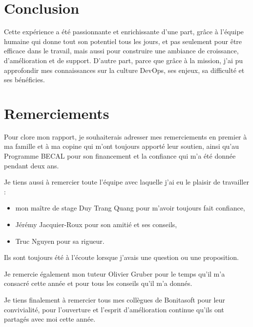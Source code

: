 \section{Conclusion}
Cette expérience a été passionnante et enrichissante d'une part, grâce à l'équipe humaine qui donne tout son potentiel tous les jours, et pas seulement pour être efficace dans le travail, mais aussi pour construire une ambiance de croissance, d'amélioration et de support.
D'autre part, parce que grâce à la mission, j'ai pu approfondir mes connaissances sur la culture DevOps, ses enjeux, sa difficulté et ses bénéficies.

\section{Remerciements}
Pour clore mon rapport, je souhaiterais adresser mes remerciements en premier à ma famille et à ma copine qui m'ont toujours apporté leur soutien, ainsi qu’au Programme BECAL pour son financement et la confiance qui m'a été donnée pendant deux ans.

Je tiens aussi à remercier toute l'équipe avec laquelle j'ai eu le plaisir de travailler :
\begin{itemize}
  \item[] mon maître de stage Duy Trang Quang pour m’avoir toujours fait confiance,
  \item[] Jérémy Jacquier-Roux pour son amitié et ses conseils,
  \item[] Truc Nguyen pour sa rigueur.
\end{itemize}
Ils sont toujours été à l'écoute lorsque j'avais une question ou une proposition.

Je remercie également mon tuteur Olivier Gruber pour le temps qu’il m’a consacré cette année et pour tous les conseils qu’il m’a donnés.

Je tiens finalement à remercier tous mes collègues de Bonitasoft pour leur convivialité, pour l’ouverture et l'esprit d'amélioration continue qu’ils ont partagés avec moi cette année.
